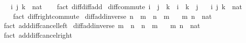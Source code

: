 \begin{isabellebody}
\ \ \ i\ j\ k\ {\isacharcolon}{\kern0pt}{\isacharcolon}{\kern0pt}\ nat\isanewline
%
\isadelimproof
\ \ %
\endisadelimproof
%
\isatagproof
{}\isamarkupfalse%
\ {\isacharparenleft}{\kern0pt}fact\ diff{\isacharunderscore}{\kern0pt}diff{\isacharunderscore}{\kern0pt}add{\isacharparenright}{\kern0pt}%
\endisatagproof
{\isafoldproof}%
%
\isadelimproof
\isanewline
%
\endisadelimproof
\isanewline
{}\isamarkupfalse%
\ diff{\isacharunderscore}{\kern0pt}commute{\isacharcolon}{\kern0pt}\ {\isachardoublequoteopen}i\ {\isacharminus}{\kern0pt}\ j\ {\isacharminus}{\kern0pt}\ k\ {\isacharequal}{\kern0pt}\ i\ {\isacharminus}{\kern0pt}\ k\ {\isacharminus}{\kern0pt}\ j{\isachardoublequoteclose}\isanewline
\ \ \ i\ j\ k\ {\isacharcolon}{\kern0pt}{\isacharcolon}{\kern0pt}\ nat\isanewline
%
\isadelimproof
\ \ %
\endisadelimproof
%
\isatagproof
{}\isamarkupfalse%
\ {\isacharparenleft}{\kern0pt}fact\ diff{\isacharunderscore}{\kern0pt}right{\isacharunderscore}{\kern0pt}commute{\isacharparenright}{\kern0pt}%
\endisatagproof
{\isafoldproof}%
%
\isadelimproof
\isanewline
%
\endisadelimproof
\isanewline
{}\isamarkupfalse%
\ diff{\isacharunderscore}{\kern0pt}add{\isacharunderscore}{\kern0pt}inverse{\isacharcolon}{\kern0pt}\ {\isachardoublequoteopen}{\isacharparenleft}{\kern0pt}n\ {\isacharplus}{\kern0pt}\ m{\isacharparenright}{\kern0pt}\ {\isacharminus}{\kern0pt}\ n\ {\isacharequal}{\kern0pt}\ m{\isachardoublequoteclose}\isanewline
\ \ \ m\ n\ {\isacharcolon}{\kern0pt}{\isacharcolon}{\kern0pt}\ nat\isanewline
%
\isadelimproof
\ \ %
\endisadelimproof
%
\isatagproof
{}\isamarkupfalse%
\ {\isacharparenleft}{\kern0pt}fact\ add{\isacharunderscore}{\kern0pt}diff{\isacharunderscore}{\kern0pt}cancel{\isacharunderscore}{\kern0pt}left{\isacharprime}{\kern0pt}{\isacharparenright}{\kern0pt}%
\endisatagproof
{\isafoldproof}%
%
\isadelimproof
\isanewline
%
\endisadelimproof
\isanewline
{}\isamarkupfalse%
\ diff{\isacharunderscore}{\kern0pt}add{\isacharunderscore}{\kern0pt}inverse{}{\isacharcolon}{\kern0pt}\ {\isachardoublequoteopen}{\isacharparenleft}{\kern0pt}m\ {\isacharplus}{\kern0pt}\ n{\isacharparenright}{\kern0pt}\ {\isacharminus}{\kern0pt}\ n\ {\isacharequal}{\kern0pt}\ m{\isachardoublequoteclose}\isanewline
\ \ \ m\ n\ {\isacharcolon}{\kern0pt}{\isacharcolon}{\kern0pt}\ nat\isanewline
%
\isadelimproof
\ \ %
\endisadelimproof
%
\isatagproof
{}\isamarkupfalse%
\ {\isacharparenleft}{\kern0pt}fact\ add{\isacharunderscore}{\kern0pt}diff{\isacharunderscore}{\kern0pt}cancel{\isacharunderscore}{\kern0pt}right{\isacharprime}{\kern0pt}{\isacharparenright}{\kern0pt}%

\end{isabellebody}
